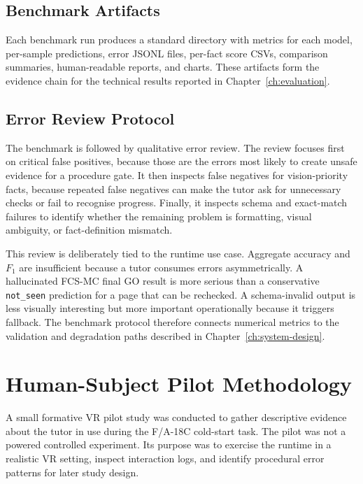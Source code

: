 \subsection{Benchmark Artifacts}

Each benchmark run produces a standard directory with metrics for each model,
per-sample predictions, error JSONL files, per-fact score CSVs, comparison
summaries, human-readable reports, and charts. These artifacts form the
evidence chain for the technical results reported in Chapter~\ref{ch:evaluation}.

\subsection{Error Review Protocol}

The benchmark is followed by qualitative error review. The review focuses first
on critical false positives, because those are the errors most likely to create
unsafe evidence for a procedure gate. It then inspects false negatives for
vision-priority facts, because repeated false negatives can make the tutor ask
for unnecessary checks or fail to recognise progress. Finally, it inspects
schema and exact-match failures to identify whether the remaining problem is
formatting, visual ambiguity, or fact-definition mismatch.

This review is deliberately tied to the runtime use case. Aggregate accuracy
and \(F_1\) are insufficient because a tutor consumes errors asymmetrically. A
hallucinated FCS-MC final GO result is more serious than a conservative
\texttt{not\_seen} prediction for a page that can be rechecked. A
schema-invalid output is less visually interesting but more important
operationally because it triggers fallback. The benchmark protocol therefore
connects numerical metrics to the validation and degradation paths described
in Chapter~\ref{ch:system-design}.

\section{Human-Subject Pilot Methodology}\label{sec:method-pilot}

A small formative VR pilot study was conducted to gather descriptive evidence
about the tutor in use during the F/A-18C cold-start task. The pilot was not a
powered controlled experiment. Its purpose was to exercise the runtime in a
realistic VR setting, inspect interaction logs, and identify procedural error
patterns for later study design.

